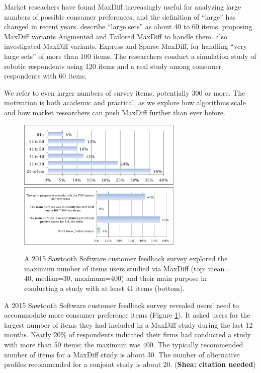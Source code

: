 \documentclass[a4paper,11pt]{article}
\begin{document}
Market reseachers have found MaxDiff increasingly useful for analyzing large numbers of possible consumer preferences, and the definition of ``large'' has changed in recent years. \cite{hendrix2007alternative} describe ``large sets'' as about 40 to 60 items, proposing MaxDiff variants Augmented and Tailored MaxDiff to handle them. \cite{wirth2012largeset} also investigated MaxDiff variants, Express and Sparse MaxDiff, for handling ``very large sets'' of more than 100 items. The researchers conduct a simulation study of robotic respondents using 120 items and a real study among consumer respondents with 60 items.

We refer to even larger numbers of survey items, potentially 300 or more. The motivation is both academic and practical, as we explore how algorithms scale and how market researchers can push MaxDiff further than ever before. 

\begin{figure}
\caption{A 2015 Sawtooth Software customer feedback survey explored the maximum number of items users studied via MaxDiff (top: mean= 40, median=30, maximum=400) and their main purpose in conducting a study with at least 41 items (bottom). } 
\label{fig:max_and_purpose}
\begin{center} 
\includegraphics[width=0.7\textwidth]{plots/maxnumstudy}
\includegraphics[width=0.7\textwidth]{plots/maxdiffpurpose}
\end{center}
\end{figure}

A 2015 Sawtooth Software customer feedback survey revealed users' need to accommodate more consumer preference items (Figure \ref{fig:max_and_purpose}). It asked users for the largest number of items they had included in a MaxDiff study during the last 12 months. Nearly 20\% of respondents indicated their firms had conducted a study with more than 50 items; the maximum was 400. The typically recommended number of items for a MaxDiff study is about 30. The number of alternative profiles recommended for a conjoint study is about 20. (\textbf{Shea: citation needed})
\end{document}
